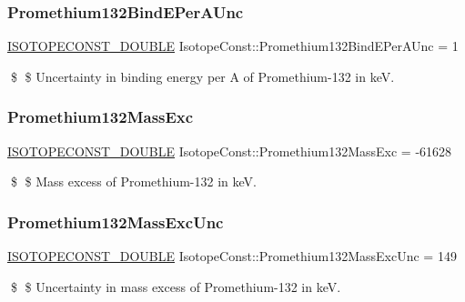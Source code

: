 \subsubsection{\texorpdfstring{Promethium132\+Bind\+E\+Per\+A\+Unc}{Promethium132BindEPerAUnc}}
{\footnotesize\ttfamily \mbox{\hyperlink{group___isotope_const-_macros_ga8f45a7272ce02c0b4c65c44636ed719a}{I\+S\+O\+T\+O\+P\+E\+C\+O\+N\+S\+T\+\_\+\+D\+O\+U\+B\+LE}} Isotope\+Const\+::\+Promethium132\+Bind\+E\+Per\+A\+Unc = 1}

\$ \$ Uncertainty in binding energy per A of Promethium-\/132 in keV. \mbox{\label{group___isotope_const-_promethium-_pm132_gaa478dc081db8febee3966708d8466c08}} 
\subsubsection{\texorpdfstring{Promethium132\+Mass\+Exc}{Promethium132MassExc}}
{\footnotesize\ttfamily \mbox{\hyperlink{group___isotope_const-_macros_ga8f45a7272ce02c0b4c65c44636ed719a}{I\+S\+O\+T\+O\+P\+E\+C\+O\+N\+S\+T\+\_\+\+D\+O\+U\+B\+LE}} Isotope\+Const\+::\+Promethium132\+Mass\+Exc = -\/61628}

\$ \$ Mass excess of Promethium-\/132 in keV. \mbox{\label{group___isotope_const-_promethium-_pm132_ga242999d3d6cde663f493fede1d6402df}} 
\subsubsection{\texorpdfstring{Promethium132\+Mass\+Exc\+Unc}{Promethium132MassExcUnc}}
{\footnotesize\ttfamily \mbox{\hyperlink{group___isotope_const-_macros_ga8f45a7272ce02c0b4c65c44636ed719a}{I\+S\+O\+T\+O\+P\+E\+C\+O\+N\+S\+T\+\_\+\+D\+O\+U\+B\+LE}} Isotope\+Const\+::\+Promethium132\+Mass\+Exc\+Unc = 149}

\$ \$ Uncertainty in mass excess of Promethium-\/132 in keV. \mbox{\label{group___isotope_const-_promethium-_pm132_gab3bd0ca20a35251203f1e0a31bbff29e}} 
